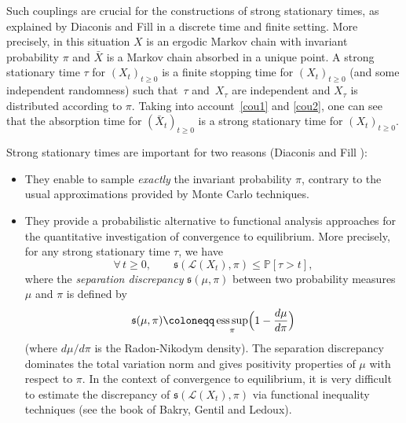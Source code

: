 \documentclass[JEP,XML,SOM,Unicode,NoFloatCountersInSection,published]{cedram}
\theoremstyle{plain}
\theoremstyle{definition}
\newcommand{\PP}{{\mathbb P}}
\newcommand\df{\coloneqq}
\newcommand{\bq}{\begin{equation*}}
\newcommand{\eq}{\end{equation*}}
\newcommand{\fo}{\forall\,}
\DeclareMathOperator*{\esssup}{ess\,sup}
\let\f\frac
\newcommand{\cL}{\mathcal{L}}
\newcommand{\fs}{\mathfrak{s}}
\begin{document}
Such couplings are crucial for the constructions of strong stationary times, as explained by Diaconis and Fill \cite{MR1071805} in a discrete time and finite setting.
More precisely, in this situation $X$ is an ergodic Markov chain with invariant probability $\pi$ and $\bar X$ is a Markov chain absorbed in a unique point.
A strong stationary time $\tau$ for $(X_t)_{t\geq 0}$ is a finite stopping time for $(X_t)_{t\geq 0}$ (and some independent randomness) such that~$\tau$ and~$X_\tau$ are independent and $X_\tau$ is distributed according to $\pi$. Taking into account~\eqref{cou1} and \eqref{cou2}, one can see that the absorption time for $(\bar X_t)_{t\geq 0}$ is a strong stationary time for $(X_t)_{t\geq 0}$.
\par
Strong stationary times are important for two reasons (\cf Diaconis and Fill \cite{MR1071805}):
\begin{itemize}
\item
They enable to sample \textit{exactly} the invariant probability $\pi$, contrary to the usual approximations provided by Monte Carlo techniques.

\item
They provide a probabilistic alternative to functional analysis approaches for the quantitative investigation of convergence to equilibrium. More precisely, for any strong stationary time $\tau$, we have
\bq
\fo t\geq 0,\qquad \fs(\cL(X_t),\pi)\leq \PP[\tau>t],
\eq
where the \emph{separation discrepancy} $\fs(\mu,\pi)$ between two probability measures $\mu$ and $\pi$ is defined by
\bq
\fs(\mu,\pi)\df\esssup_{\pi}\Bigl(1-\f{d\mu}{d\pi}\Bigr)\eq
(where $d\mu/d\pi$ is the Radon-Nikodym density). The separation discrepancy dominates the total variation norm and gives positivity properties of $\mu$ with respect to $\pi$.
In the context of convergence to equilibrium, it is very difficult to estimate the discrepancy of $\fs(\cL(X_t),\pi)$ via functional inequality techniques (see \eg the book \cite{MR3155209} of Bakry, Gentil and Ledoux).
\end{itemize}
\end{document}

